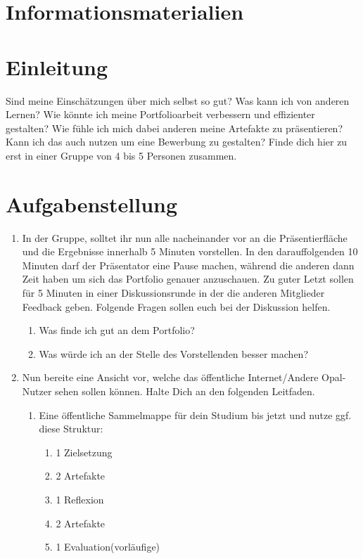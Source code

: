 \documentclass[a4paper,oneside]{scrarticle}
\begin{document}
	\pagebreak 
	
	\section*{Informationsmaterialien}
	
	
	
	
	
	\pagebreak
	
	\section*{Einleitung}
	Sind meine Einschätzungen über mich selbst so gut? Was kann ich von anderen Lernen? Wie könnte ich meine Portfolioarbeit verbessern und effizienter gestalten? Wie fühle ich mich dabei anderen meine Artefakte zu präsentieren? Kann ich das auch nutzen um eine Bewerbung zu gestalten? Finde dich hier zu erst in einer Gruppe von 4 bis 5 Personen zusammen.
	
	\section*{Aufgabenstellung}

	\begin{enumerate}
		\item In der Gruppe, solltet ihr nun alle nacheinander vor an die Präsentierfläche und die Ergebnisse innerhalb 5 Minuten vorstellen. In den darauffolgenden 10 Minuten darf der Präsentator eine Pause machen, während die anderen dann Zeit haben um sich das Portfolio genauer anzuschauen. Zu guter Letzt sollen für 5 Minuten in einer Diskussionsrunde in der die anderen Mitglieder Feedback geben. Folgende Fragen sollen euch bei der Diskussion helfen. 
		\begin{enumerate}
			\item Was finde ich gut an dem Portfolio?
			\item Was würde ich an der Stelle des Vorstellenden besser machen?
		\end{enumerate}
		\item Nun bereite eine Ansicht vor, welche das öffentliche Internet/Andere Opal-Nutzer sehen sollen können. Halte Dich an den folgenden Leitfaden.
		\begin{enumerate}
			\item Eine öffentliche Sammelmappe für dein Studium bis jetzt und nutze ggf. diese Struktur:
			\begin{enumerate}
				\item 1 Zielsetzung
				\item 2 Artefakte
				\item 1 Reflexion
				\item 2 Artefakte
				\item 1 Evaluation(vorläufige)
			\end{enumerate}
		\end{enumerate}

	\end{enumerate}
\end{document}
